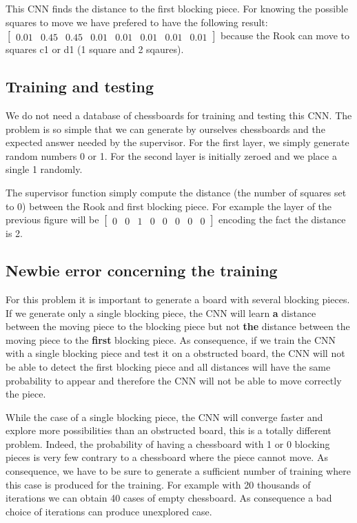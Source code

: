 \documentclass[a4paper,10pt]{article}
\begin{document}
This CNN finds the distance to the first blocking piece. For knowing the
possible squares to move we have prefered to have the following result:
$\begin{bmatrix} 0.01 & 0.45 & 0.45 & 0.01 & 0.01 & 0.01 & 0.01 &
  0.01 \end{bmatrix}$ because the Rook can move to squares c1 or d1 (1 square
and 2 sqaures).

\subsection{Training and testing}

We do not need a database of chessboards for training and testing this CNN. The
problem is so simple that we can generate by ourselves chessboards and the
expected answer needed by the supervisor. For the first layer, we simply
generate random numbers 0 or 1. For the second layer is initially zeroed and we
place a single 1 randomly.

The supervisor function simply compute the distance (the number of squares set
to 0) between the Rook and first blocking piece. For example the layer of the
previous figure will be $\begin{bmatrix} 0 & 0 & 1 & 0 & 0 & 0 & 0 &
  0 \end{bmatrix}$ encoding the fact the distance is 2.

\subsection{Newbie error concerning the training}

For this problem it is important to generate a board with several blocking
pieces. If we generate only a single blocking piece, the CNN will learn
\textbf{a} distance between the moving piece to the blocking piece but not
\textbf{the} distance between the moving piece to the \textbf{first} blocking
piece. As consequence, if we train the CNN with a single blocking piece and test
it on a obstructed board, the CNN will not be able to detect the first blocking
piece and all distances will have the same probability to appear and therefore
the CNN will not be able to move correctly the piece.

While the case of a single blocking piece, the CNN will converge faster and
explore more possibilities than an obstructed board, this is a totally different
problem. Indeed, the probability of having a chessboard with 1 or 0 blocking
pieces is very few contrary to a chessboard where the piece cannot move. As
consequence, we have to be sure to generate a sufficient number of training
where this case is produced for the training. For example with 20 thousands of
iterations we can obtain 40 cases of empty chessboard. As consequence a bad
choice of iterations can produce unexplored case.
\end{document}
